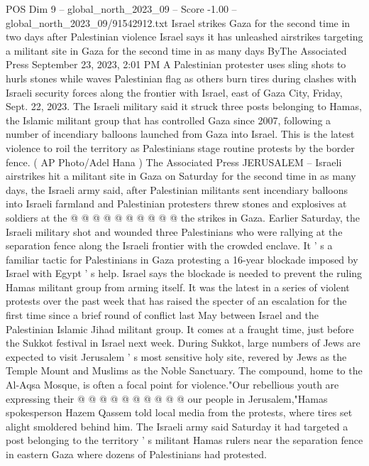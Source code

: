 \begin{textsample}{POS Dim 9 – global\_north\_2023\_09 – Score -1.00 – global\_north\_2023\_09/91542912.txt}  \label{ex:f9_pos_411}
Israel strikes Gaza for the second time in two days after Palestinian violence Israel says it has unleashed airstrikes targeting a militant site in Gaza for the second time in as many days ByThe Associated Press September 23, 2023, 2:01 PM A Palestinian protester uses sling shots to hurls stones while waves Palestinian flag as others burn tires during clashes with Israeli security forces along the frontier with Israel, east of Gaza City, Friday, Sept. 22, 2023.
The Israeli military said it struck three posts belonging to Hamas, the Islamic militant group that has controlled Gaza since 2007, following a number of incendiary balloons launched from Gaza into Israel.
This is the latest violence to roil the territory as Palestinians stage routine protests by the border fence. ( AP Photo/Adel Hana ) The Associated Press JERUSALEM -- Israeli airstrikes hit a militant site in Gaza on Saturday for the second time in as many days, the Israeli army said, after Palestinian militants sent incendiary balloons into Israeli farmland and Palestinian protesters threw stones and explosives at soldiers at the @ @ @ @ @ @ @ @ @ @ the strikes in Gaza.
Earlier Saturday, the Israeli military shot and wounded three Palestinians who were rallying at the separation fence along the Israeli frontier with the crowded enclave.
It ' s a familiar tactic for Palestinians in Gaza protesting a 16-year blockade imposed by Israel with Egypt ' s help.
Israel says the blockade is needed to prevent the ruling Hamas militant group from arming itself.
It was the latest in a series of violent protests over the past week that has raised the specter of an escalation for the first time since a brief round of conflict last May between Israel and the Palestinian Islamic Jihad militant group.
It comes at a fraught time, just before the Sukkot festival in Israel next week.
During Sukkot, large numbers of Jews are expected to visit Jerusalem ' s most sensitive holy site, revered by Jews as the Temple Mount and Muslims as the Noble Sanctuary.
The compound, home to the Al-Aqsa Mosque, is often a focal point for violence."Our rebellious youth are expressing their @ @ @ @ @ @ @ @ @ @ our people in Jerusalem,"Hamas spokesperson Hazem Qassem told local media from the protests, where tires set alight smoldered behind him.
The Israeli army said Saturday it had targeted a post belonging to the territory ' s militant Hamas rulers near the separation fence in eastern Gaza where dozens of Palestinians had protested.

\end{textsample}
